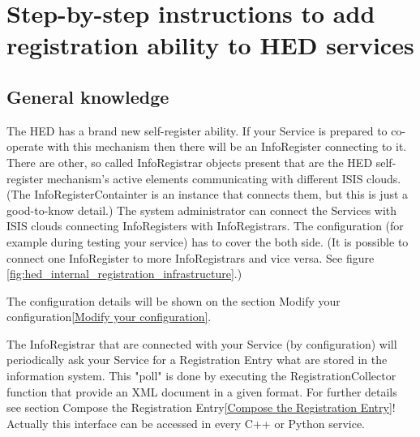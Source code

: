 \section{Step-by-step instructions to add registration ability to HED services}
\label{annex:service_registration}
\subsection{General knowledge}
\label{General knowledge}
The HED has a brand new self-register ability. If your Service is prepared to co-operate with this mechanism then there will be an InfoRegister connecting to it. There are other, so called InfoRegistrar objects present that are the HED self-register mechanism's active elements communicating with different ISIS clouds. (The InfoRegisterContainter is an instance that connects them, but this is just a good-to-know detail.) The system administrator can connect the Services with ISIS clouds connecting InfoRegisters with InfoRegistrars. The configuration (for example during testing your service) has to cover the both side. (It is possible to connect one InfoRegister to more InfoRegistrars and vice versa. See figure \ref{fig:hed_internal_registration_infrastructure}.)
\begin{figure}[ht]
\end{figure}

The configuration details will be shown on the section Modify your configuration\ref{Modify your configuration}.

The InfoRegistrar that are connected with your Service (by configuration) will periodically ask your Service for a Registration Entry what are stored in the information system. This "poll" is done by executing the RegistrationCollector function that provide an XML document in a given format. For further details see section Compose the Registration Entry\ref{Compose the Registration Entry}! Actually this interface can be accessed in every C++ or Python service.

